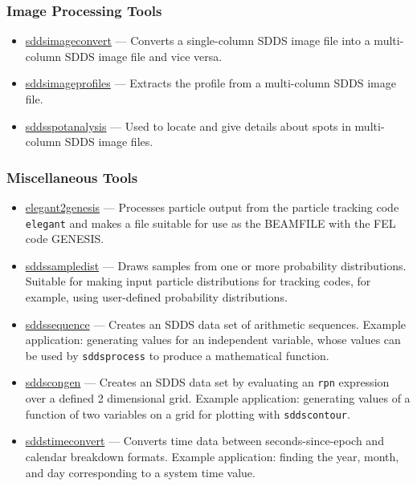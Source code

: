\documentclass[11pt]{article}
\newcommand{\progref}[1]{\hyperref[#1]{#1}}
\begin{document}
\subsubsection{Image Processing Tools}

\begin{itemize}

\item \progref{sddsimageconvert} --- Converts a single-column SDDS image file into a multi-column SDDS image file and vice versa.

\item \progref{sddsimageprofiles} --- Extracts the profile from a multi-column SDDS image file.

\item \progref{sddsspotanalysis} --- Used to locate and give details about spots in multi-column SDDS image files.

\end{itemize}

\subsubsection{Miscellaneous Tools}

\begin{itemize}

\item \progref{elegant2genesis} --- Processes particle output from the particle tracking code
        \verb|elegant|\cite{elegant}
        and makes a file suitable for use as the BEAMFILE with the FEL code GENESIS\cite{GENESIS}.

\item \progref{sddssampledist} --- Draws samples from one or more probability distributions.
        Suitable for making input particle distributions for tracking codes, for example, 
        using user-defined probability distributions.

\item \progref{sddssequence} --- Creates an SDDS data set of arithmetic sequences. 
Example application: generating values for an independent variable, whose values can be used by
{\tt sddsprocess} to produce a mathematical function.

\item \progref{sddscongen} --- Creates an SDDS data set by evaluating an \verb|rpn| expression over a defined 2
dimensional grid.  Example application: generating values of a function of two variables on a grid for plotting
with {\tt sddscontour}.

\item \progref{sddstimeconvert} --- Converts time data between seconds-since-epoch and calendar breakdown formats.
Example application: finding the year, month, and day corresponding to a system time value.

\end{itemize}
\end{document}
